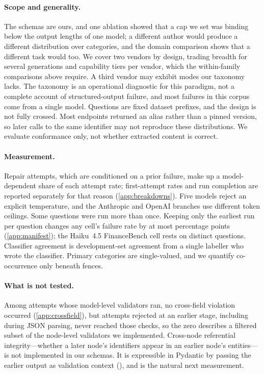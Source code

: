 \paragraph{Scope and generality.}
The schemas are ours, and one ablation showed that a cap we set was
binding below the output lengths of one model; a different author would
produce a different distribution over categories, and the domain
comparison shows that a different task would too. We cover two vendors
by design, trading breadth for several generations and capability tiers
per vendor, which the within-family comparisons above require. A third
vendor may exhibit modes our taxonomy lacks. The taxonomy is an operational
diagnostic for this paradigm, not a complete account of structured-output
failure, and most failures in this corpus come from a single model. Questions are fixed dataset
prefixes, and the design is not fully crossed. Most endpoints returned an
alias rather than a pinned version, so later calls to the same identifier
may not reproduce these distributions. We evaluate conformance only, not
whether extracted content is correct.

\paragraph{Measurement.}
Repair attempts, which are conditioned on a prior failure, make up a
model-dependent share of each attempt rate; first-attempt rates and run
completion are reported separately for that reason (\cref{app:breakdowns}).
Five models reject an explicit temperature, and the Anthropic and OpenAI
branches use different token ceilings. Some questions were run more than
once. Keeping only the earliest run per question changes any cell's
failure rate by at most 
percentage points (\cref{app:manifest}); the Haiku~4.5 FinanceBench cell
rests on  distinct
questions. Classifier agreement is development-set agreement from a
single labeller who wrote the classifier. Primary categories are
single-valued, and we quantify co-occurrence only beneath fences.

\paragraph{What is not tested.}
Among attempts whose model-level validators ran, no cross-field
violation occurred (\cref{app:crossfield}), but attempts rejected at an
earlier stage, including during JSON parsing, never reached those checks,
so the zero describes a filtered subset of the node-level validators we
implemented. Cross-node referential integrity---whether a later node's
identifiers appear in an earlier node's entities---is not implemented in
our schemas. It is expressible in Pydantic by passing the earlier output
as validation context (),
and is the natural next measurement.
